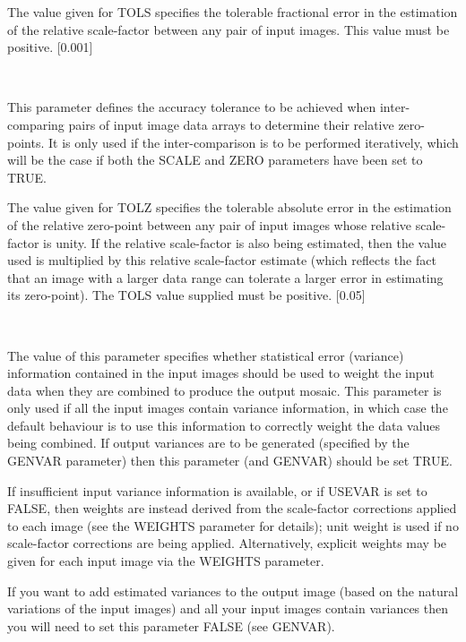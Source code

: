 \documentclass[twoside,11pt]{article}
\renewcommand{\_}{\texttt{\symbol{95}}}
\newcommand{\sstsubsection}[1]{ \item[{#1}] \mbox{} \\}
\newcommand{\sstsubsection}[1]{\item[{#1}]}
\begin{document}
{{{         The value given for TOLS specifies the tolerable fractional
         error in the estimation of the relative scale-factor between
         any pair of input images. This value must be positive.
         [0.001]
      }
      \sstsubsection{
         TOLZ = \_REAL (Read)
      } {
         This parameter defines the accuracy tolerance to be achieved
         when inter-comparing pairs of input image data arrays to
         determine their relative zero-points. It is only used if the
         inter-comparison is to be performed iteratively, which will be
         the case if both the SCALE and ZERO parameters have been set
         to TRUE.

         The value given for TOLZ specifies the tolerable absolute
         error in the estimation of the relative zero-point between any
         pair of input images whose relative scale-factor is unity. If
         the relative scale-factor is also being estimated, then the
         value used is multiplied by this relative scale-factor
         estimate (which reflects the fact that an image with a larger
         data range can tolerate a larger error in estimating its
         zero-point). The TOLS value supplied must be positive.
         [0.05]
      }
      \sstsubsection{
         USEVAR = \_LOGICAL (Read)
      } {
        The value of this parameter specifies whether statistical
        error (variance) information contained in the input images
        should be used to weight the input data when they are combined
        to produce the output mosaic. This parameter is only used if
        all the input images contain variance information, in which case
        the default behaviour is to use this information to correctly
        weight the data values being combined. If output variances are
        to be generated (specified by the GENVAR parameter) then this
        parameter (and GENVAR) should be set TRUE.

        If insufficient input variance information is available, or if
        USEVAR is set to FALSE, then weights are instead derived from
        the scale-factor corrections applied to each image (see the
        WEIGHTS parameter for details); unit weight is used if no
        scale-factor corrections are being applied. Alternatively,
        explicit weights may be given for each input image via the
        WEIGHTS parameter.

        If you want to add estimated variances to the output image
        (based on the natural variations of the input images) and all
        your input images contain variances then you will need to set
        this parameter FALSE (see GENVAR).

}}}
\end{document}
